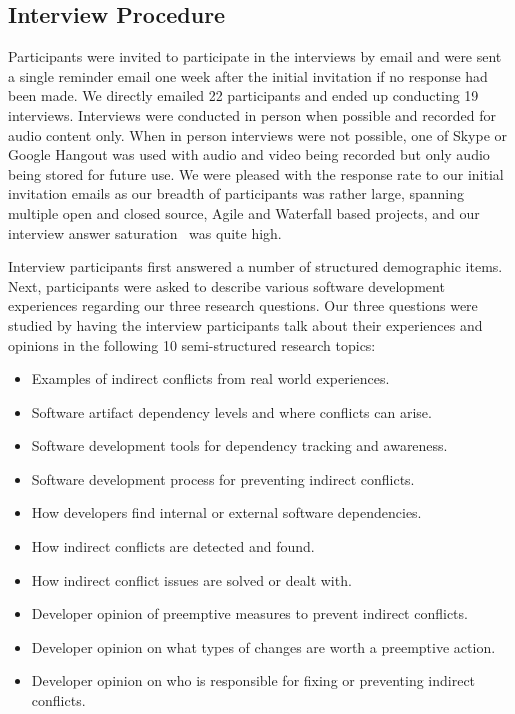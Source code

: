 \documentclass[conference]{IEEEtran}
\newcommand{\totalCategories}{10}
\begin{document}
\subsection{Interview Procedure}

Participants were invited to participate in the interviews by email and were sent a single reminder email one week
after the initial invitation if no response had been made. We directly emailed 22 participants and ended up conducting
19 interviews. Interviews were conducted in person when possible and recorded for audio content only. When in person
interviews were not possible, one of Skype or Google Hangout was used with audio and video being recorded but only
audio being stored for future use. We were pleased with the response rate to our initial invitation emails as
our breadth of participants was rather large, spanning multiple open and closed source, Agile and Waterfall based projects,
and our interview answer saturation~\cite{Guest:2006:SAP} was quite high.

Interview participants first answered a number of structured demographic items. Next, participants were 
asked to describe various software development experiences regarding our three research questions.
Our three questions were studied by having the interview participants talk about their experiences and opinions in the following
\totalCategories{} semi-structured research topics:

\begin{itemize}
\item Examples of indirect conflicts from real world experiences.
\item Software artifact dependency levels and where conflicts can arise.
\item Software development tools for dependency tracking and awareness.
\item Software development process for preventing indirect conflicts.
\item How developers find internal or external software dependencies.
\item How indirect conflicts are detected and found.
\item How indirect conflict issues are solved or dealt with.
\item Developer opinion of preemptive measures to prevent indirect conflicts.
\item Developer opinion on what types of changes are worth a preemptive action.
\item Developer opinion on who is responsible for fixing or preventing indirect conflicts.
\end{itemize}
\end{document}
